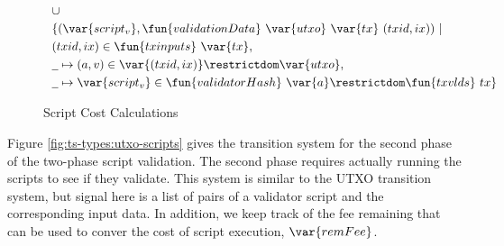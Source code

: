 \begin{figure}[htb]
\begin{align*}
    & ~~\cup~ \\
    & ~~\{ (\var{script_v},\fun{validationData}~\var{utxo}~\var{tx}~
      (txid,ix)) ~\vert \\
    & ~~(txid,ix) \in \fun{txinputs}~\var{tx}, \\
    & ~~ \wcard \mapsto (a,v) \in \var{(txid,ix)}\restrictdom\var{utxo}, \\
    & ~~\wcard\mapsto \var{script_v}\in
     \fun{validatorHash}~\var{a}\restrictdom\fun{txvlds}~{tx}\}
  \end{align*}
  \caption{Script Cost Calculations}
  \label{fig:functions:script2}
\end{figure}

Figure \ref{fig:ts-types:utxo-scripts} gives the transition system for the second phase of
the two-phase script validation. The second phase requires actually running
the scripts to see if they validate. This system is similar to
the UTXO transition system, but signal here is a list of pairs of a validator
script and the corresponding input data. In addition, we keep track of the
fee remaining that can be used to conver the cost of script execution, $\var{remFee}$.

